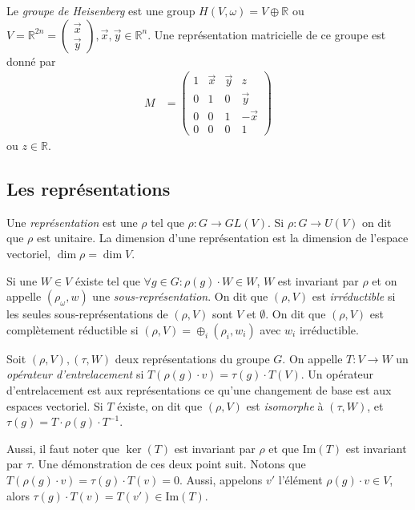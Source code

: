\documentclass[10pt]{report}
\begin{document}
Le \emph{groupe de Heisenberg} est une group $H(V,\omega) = V \oplus \mathbb{R}$ ou $V = \mathbb{R}^{2n} = \begin{pmatrix} \vec{x}\\ \vec{y} \end{pmatrix} , \vec{x}, \vec{y} \in \mathbb{R}^n$. Une repr\'esentation matricielle de ce groupe est donn\'e par
\begin{align}
    M &= \begin{pmatrix} 1 & \vec{x} & \vec{y} & z\\0 & 1 & 0 & \vec{y}\\0 & 0 & 1 & -\vec{x}\\0 & 0 & 0 & 1 \end{pmatrix} 
\end{align}
ou $z \in \mathbb{R}$. 

\subsection{Les repr\'esentations}

Une \emph{repr\'esentation} est une $\rho$ tel que $\rho: G \to GL(V)$. Si $\rho: G \to U(V)$ on dit que $\rho$ est unitaire. La dimension d'une repr\'esentation est la dimension de l'espace vectoriel, $\dim \rho = \dim V$.

Si une $W \in V$ \'existe tel que $\forall g \in G: \rho(g) \cdot W \in W$, $W$ est invariant par $\rho$ et on appelle $(\rho_\omega, w)$ une \emph{sous-repr\'esentation}. On dit que $(\rho,V)$ est \emph{irr\'eductible} si les seules sous-repr\'esentations de $(\rho,V)$ sont $V$ et $\emptyset$. On dit que $(\rho,V)$ est compl\`etement r\'eductible si $(\rho,V) = \oplus_i (\rho_i,w_i)$ avec $w_i$ irr\'eductible.

Soit $(\rho,V), (\tau,W)$ deux repr\'esentations du groupe $G$. On appelle $T: V\to W$ un \emph{op\'erateur d'entrelacement} si $T(\rho(g)\cdot v) = \tau(g) \cdot T(V)$. Un op\'erateur d'entrelacement est aux repr\'esentations ce qu'une changement de base est aux espaces vectoriel. Si $T$ \'existe, on dit que $(\rho,V)$ est \emph{isomorphe} \`a $(\tau,W)$, et $\tau(g) = T \cdot \rho(g) \cdot T^{-1}$. 

Aussi, il faut noter que $\ker(T)$ est invariant par $\rho$ et que $\mathrm{Im}(T)$ est invariant par $\tau$. Une d\'emonstration de ces deux point suit. Notons que $T(\rho(g) \cdot v) = \tau(g) \cdot T(v) = 0$. Aussi, appelons $v'$ l'\'el\'ement $\rho(g) \cdot v \in V$, alors $\tau(g) \cdot T(v) = T(v') \in \mathrm{Im}(T)$.
\end{document}
